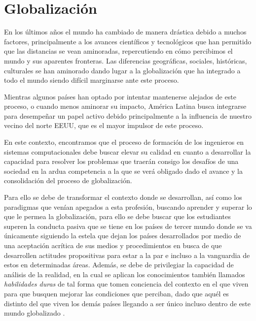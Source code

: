 
\section{Globalización}

En los últimos años el mundo ha cambiado de manera drástica debido a muchos factores, principalmente a los avances científicos y tecnológicos que han permitido que las distancias se vean aminoradas, repercutiendo en cómo percibimos el mundo y sus aparentes fronteras. Las diferencias geográficas, sociales, históricas, culturales se han aminorado dando lugar a la globalización que ha integrado a todo el mundo siendo difícil marginarse ante este proceso.
\vspace{5mm}

\noindent Mientras algunos países han optado por intentar mantenerse alejados de este proceso, o cuando menos aminorar su impacto, América Latina busca integrarse para desempeñar un papel activo debido principalmente a la influencia de nuestro vecino del norte EEUU, que es el mayor impulsor de este proceso. 
\vspace{5mm}

\noindent En este contexto, encontramos que el proceso de formación de los ingenieros en sistemas computacionales debe buscar elevar su calidad en cuanto a desarrollar la capacidad para resolver los problemas que traerán consigo los desafíos de una sociedad en la ardua competencia a la que se verá obligado dado el avance y la consolidación del proceso de globalización.
\vspace{5mm}

\noindent Para ello se debe de transformar el contexto donde se desarrollan, así como los paradigmas que venían apegados a esta profesión, buscando aprender y superar lo que le permea la globalización, para ello se debe buscar que los estudiantes superen la conducta pasiva que se tiene en los países de tercer mundo donde se va únicamente siguiendo la estela que dejan los países desarrollados por medio de una aceptación acrítica de sus medios y procedimientos en busca de que desarrollen actitudes propositivas para estar a la par e incluso a la vanguardia de estos en determinadas áreas. Además, se debe de privilegiar la capacidad de análisis de la realidad, en la cual se aplican los conocimientos también llamados \textit{habilidades duras} de tal forma que tomen conciencia del contexto en el que viven para que busquen mejorar las condiciones que perciban, dado que aquél es distinto del que viven los demás países llegando a ser único incluso dentro de este mundo globalizado \cite{res:2008}.
\vspace{5mm}

